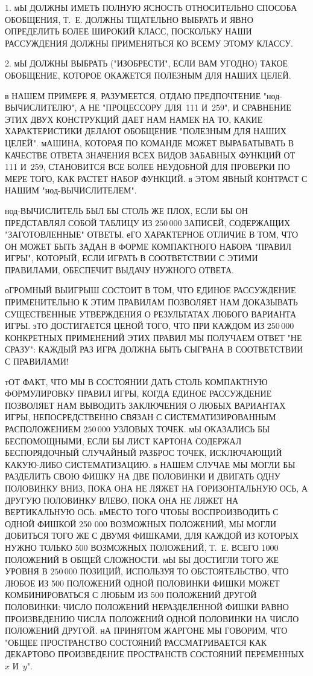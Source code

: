 \medskip
\item{1.} мЫ ДОЛЖНЫ ИМЕТЬ ПОЛНУЮ ЯСНОСТЬ ОТНОСИТЕЛЬНО СПОСОБА ОБОБЩЕНИЯ, 
Т.~Е. ДОЛЖНЫ ТЩАТЕЛЬНО ВЫБРАТЬ И ЯВНО ОПРЕДЕЛИТЬ БОЛЕЕ ШИРОКИЙ КЛАСС, ПОСКОЛЬКУ
НАШИ РАССУЖДЕНИЯ ДОЛЖНЫ ПРИМЕНЯТЬСЯ КО ВСЕМУ ЭТОМУ КЛАССУ.

\item{2.} мЫ  ДОЛЖНЫ ВЫБРАТЬ ("ИЗОБРЕСТИ", ЕСЛИ ВАМ УГОДНО) ТАКОЕ ОБОБЩЕНИЕ, 
КОТОРОЕ ОКАЖЕТСЯ ПОЛЕЗНЫМ ДЛЯ НАШИХ ЦЕЛЕЙ.
\medskip

в НАШЕМ ПРИМЕРЕ Я, РАЗУМЕЕТСЯ, ОТДАЮ ПРЕДПОЧТЕНИЕ "нод-ВЫЧИСЛИТЕЛЮ", А 
НЕ "ПРОЦЕССОРУ ДЛЯ~111 И~259", И СРАВНЕНИЕ ЭТИХ ДВУХ КОНСТРУКЦИЙ ДАЕТ НАМ
НАМЕК НА ТО, КАКИЕ ХАРАКТЕРИСТИКИ ДЕЛАЮТ ОБОБЩЕНИЕ "ПОЛЕЗНЫМ ДЛЯ НАШИХ ЦЕЛЕЙ". 
мАШИНА, КОТОРАЯ ПО КОМАНДЕ МОЖЕТ ВЫРАБАТЫВАТЬ В КАЧЕСТВЕ ОТВЕТА
ЗНАЧЕНИЯ ВСЕХ ВИДОВ ЗАБАВНЫХ ФУНКЦИЙ ОТ 111 И~259, СТАНОВИТСЯ ВСЕ БОЛЕЕ 
НЕУДОБНОЙ ДЛЯ ПРОВЕРКИ ПО МЕРЕ ТОГО, КАК РАСТЕТ НАБОР ФУНКЦИЙ. в ЭТОМ ЯВНЫЙ
КОНТРАСТ С НАШИМ "нод-ВЫЧИСЛИТЕЛЕМ".

нод-ВЫЧИСЛИТЕЛЬ БЫЛ БЫ СТОЛЬ ЖЕ ПЛОХ, ЕСЛИ БЫ ОН ПРЕДСТАВЛЯЛ СОБОЙ ТАБЛИЦУ 
ИЗ $250\,000$ ЗАПИСЕЙ, СОДЕРЖАЩИХ "ЗАГОТОВЛЕННЫЕ" ОТВЕТЫ. еГО ХАРАКТЕРНОЕ
ОТЛИЧИЕ В ТОМ, ЧТО ОН МОЖЕТ БЫТЬ ЗАДАН В ФОРМЕ КОМПАКТНОГО НАБОРА 
"ПРАВИЛ ИГРЫ", КОТОРЫЙ, ЕСЛИ ИГРАТЬ В СООТВЕТСТВИИ С ЭТИМИ ПРАВИЛАМИ, 
ОБЕСПЕЧИТ ВЫДАЧУ НУЖНОГО ОТВЕТА.

оГРОМНЫЙ ВЫИГРЫШ СОСТОИТ В ТОМ, ЧТО ЕДИНОЕ РАССУЖДЕНИЕ ПРИМЕНИТЕЛЬНО К ЭТИМ 
ПРАВИЛАМ ПОЗВОЛЯЕТ НАМ ДОКАЗЫВАТЬ СУЩЕСТВЕННЫЕ УТВЕРЖДЕНИЯ О РЕЗУЛЬТАТАХ
ЛЮБОГО ВАРИАНТА ИГРЫ. эТО ДОСТИГАЕТСЯ ЦЕНОЙ ТОГО, ЧТО ПРИ КАЖДОМ 
ИЗ $250\,000$ КОНКРЕТНЫХ ПРИМЕНЕНИЙ ЭТИХ ПРАВИЛ МЫ ПОЛУЧАЕМ ОТВЕТ "НЕ СРАЗУ": 
КАЖДЫЙ РАЗ ИГРА ДОЛЖНА БЫТЬ СЫГРАНА В СООТВЕТСТВИИ С ПРАВИЛАМИ!

тОТ ФАКТ, ЧТО МЫ В СОСТОЯНИИ ДАТЬ СТОЛЬ КОМПАКТНУЮ ФОРМУЛИРОВКУ ПРАВИЛ ИГРЫ, 
КОГДА ЕДИНОЕ РАССУЖДЕНИЕ ПОЗВОЛЯЕТ НАМ ВЫВОДИТЬ ЗАКЛЮЧЕНИЯ О ЛЮБЫХ
ВАРИАНТАХ ИГРЫ, НЕПОСРЕДСТВЕННО СВЯЗАН С СИСТЕМАТИЗИРОВАННЫМ РАСПОЛОЖЕНИЕМ 
$250\,000$ УЗЛОВЫХ ТОЧЕК. мЫ ОКАЗАЛИСЬ БЫ БЕСПОМОЩНЫМИ, ЕСЛИ БЫ ЛИСТ КАРТОНА 
СОДЕРЖАЛ БЕСПОРЯДОЧНЫЙ СЛУЧАЙНЫЙ РАЗБРОС ТОЧЕК, ИСКЛЮЧАЮЩИЙ КАКУЮ-ЛИБО
СИСТЕМАТИЗАЦИЮ. в НАШЕМ СЛУЧАЕ МЫ МОГЛИ БЫ РАЗДЕЛИТЬ СВОЮ ФИШКУ НА ДВЕ 
ПОЛОВИНКИ И ДВИГАТЬ ОДНУ ПОЛОВИНКУ ВНИЗ, ПОКА ОНА НЕ ЛЯЖЕТ НА ГОРИЗОНТАЛЬНУЮ 
ОСЬ, А ДРУГУЮ ПОЛОВИНКУ ВЛЕВО, ПОКА ОНА НЕ ЛЯЖЕТ НА ВЕРТИКАЛЬНУЮ ОСЬ. вМЕСТО 
ТОГО ЧТОБЫ ВОСПРОИЗВОДИТЬ С ОДНОЙ ФИШКОЙ 250 000 ВОЗМОЖНЫХ ПОЛОЖЕНИЙ, МЫ МОГЛИ 
ДОБИТЬСЯ ТОГО ЖЕ С ДВУМЯ ФИШКАМИ, ДЛЯ КАЖДОЙ ИЗ КОТОРЫХ НУЖНО ТОЛЬКО 500 
ВОЗМОЖНЫХ ПОЛОЖЕНИЙ, Т.~Е. ВСЕГО 1000 ПОЛОЖЕНИЙ В ОБЩЕЙ СЛОЖНОСТИ. мЫ БЫ 
ДОСТИГЛИ ТОГО ЖЕ УРОВНЯ В $250\,000$ ПОЗИЦИЙ, ИСПОЛЬЗУЯ ТО ОБСТОЯТЕЛЬСТВО, 
ЧТО ЛЮБОЕ ИЗ 500 ПОЛОЖЕНИЙ ОДНОЙ ПОЛОВИНКИ ФИШКИ МОЖЕТ КОМБИНИРОВАТЬСЯ  С 
ЛЮБЫМ ИЗ 500 ПОЛОЖЕНИЙ ДРУГОЙ ПОЛОВИНКИ: ЧИСЛО ПОЛОЖЕНИЙ НЕРАЗДЕЛЕННОЙ ФИШКИ 
РАВНО ПРОИЗВЕДЕНИЮ ЧИСЛА ПОЛОЖЕНИЙ ОДНОЙ ПОЛОВИНКИ НА ЧИСЛО ПОЛОЖЕНИЙ
ДРУГОЙ. нА ПРИНЯТОМ ЖАРГОНЕ МЫ ГОВОРИМ, ЧТО "ОБЩЕЕ ПРОСТРАНСТВО СОСТОЯНИЙ 
РАССМАТРИВАЕТСЯ КАК ДЕКАРТОВО ПРОИЗВЕДЕНИЕ  ПРОСТРАНСТВ СОСТОЯНИЙ
ПЕРЕМЕННЫХ $x$ И~$y$".

